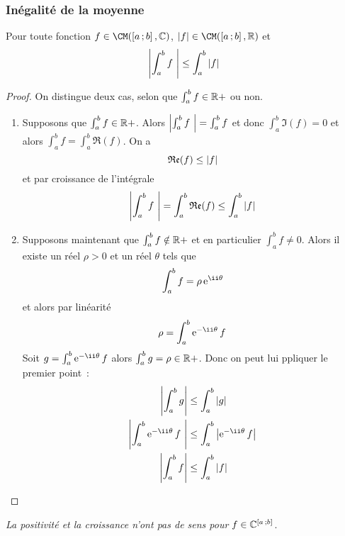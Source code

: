 \subsubsection{Inégalité de la moyenne}

\begin{theo}
  Pour toute fonction $f \in \CM(\intervalleff{a}{b},\C)$, $\abs{f} \in \CM(\intervalleff{a}{b},\R)$ et
  \begin{equation}
    \left\lvert\int_a^b f~\right\rvert \leq \int_a^b \left\lvert f\right\rvert
  \end{equation}
\end{theo}
\begin{proof}
  On distingue deux cas, selon que $\int_a^b f \in \mathbb{R}+$ ou non.
  \begin{enumerate}
  \item Supposons que $\int_a^b f \in \mathbb{R}+$. Alors $\left\lvert\int_a^b f~\right\rvert=\int_a^b f$ et donc $\int_a^b \Im(f) =0$ et alors $\int_a^b f = \int_a^b \Re(f)$. On a
    \begin{equation}
      \mathfrak{Re}(f) \leq \left\lvert f\right\rvert
    \end{equation}
    et par croissance de l'intégrale
    \begin{equation}
      \left\lvert\int_a^b f~\right\rvert = \int_a^b \mathfrak{Re}(f) \leq \int_a^b \left\lvert f\right\rvert
    \end{equation}
  \item Supposons maintenant que $\int_a^b f \notin \mathbb{R}+$ et en particulier $\int_a^b f \neq 0$. Alors il existe un réel $\rho >0$ et un réel $\theta$ tels que
    \begin{equation}
      \int_a^b f = \rho \e^{\ii \theta}
    \end{equation}
    et alors par linéarité
    \begin{equation}
      \rho = \int_a^b \e^{-\ii \theta}f
    \end{equation}
    Soit $g=\int_a^b \e^{-\ii \theta}f$ alors $\int_a^b g=\rho \in \mathbb{R}+$. Donc on peut lui ppliquer le premier point~:
    \begin{align}
      \abs{\int_a^b g} &\leq \int_a^b \abs{g} \\
      \abs{\int_a^b \e^{-\ii \theta} f~} &\leq \int_a^b \abs{\e^{-\ii \theta} f} \\
      \abs{\int_a^b f} &\leq \int_a^b \abs{f} \\
    \end{align}
  \end{enumerate}
\end{proof}

\danger \emph{La positivité et la croissance n'ont pas de sens pour $f \in \mathbb{C}^{\left[ a \, ;  b \right]}$}.